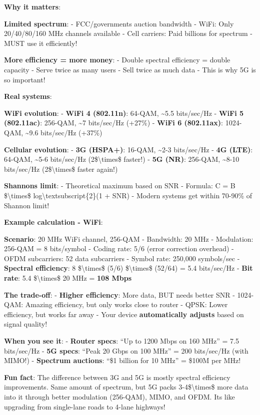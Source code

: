 \textbf{Why it matters}:

\textbf{Limited spectrum}: - FCC/governments auction bandwidth - WiFi:
Only 20/40/80/160 MHz channels available - Cell carriers: Paid billions
for spectrum - MUST use it efficiently!

\textbf{More efficiency = more money}: - Double spectral efficiency =
double capacity - Serve twice as many users - Sell twice as much data -
This is why 5G is so important!

\textbf{Real systems}:

\textbf{WiFi evolution}: - \textbf{WiFi 4 (802.11n)}: 64-QAM,
\textasciitilde5.5 bits/sec/Hz - \textbf{WiFi 5 (802.11ac)}: 256-QAM,
\textasciitilde7 bits/sec/Hz (+27\%) - \textbf{WiFi 6 (802.11ax)}:
1024-QAM, \textasciitilde9.6 bits/sec/Hz (+37\%)

\textbf{Cellular evolution}: - \textbf{3G (HSPA+)}: 16-QAM,
\textasciitilde2-3 bits/sec/Hz - \textbf{4G (LTE)}: 64-QAM,
\textasciitilde5-6 bits/sec/Hz (2\$\textbackslash times\$ faster!) -
\textbf{5G (NR)}: 256-QAM, \textasciitilde8-10 bits/sec/Hz
(2\$\textbackslash times\$ faster again!)

\textbf{Shannon\textquotesingle s limit}: - Theoretical maximum based on
SNR - Formula: C = B \$\textbackslash times\$
log\textbackslash textsubscript\{2\}(1 + SNR) - Modern systems get
within 70-90\% of Shannon limit!

\textbf{Example calculation - WiFi}:

\textbf{Scenario}: 20 MHz WiFi channel, 256-QAM - Bandwidth: 20 MHz -
Modulation: 256-QAM = 8 bits/symbol - Coding rate: 5/6 (error correction
overhead) - OFDM subcarriers: 52 data subcarriers - Symbol rate: 250,000
symbols/sec - \textbf{Spectral efficiency}: 8 \$\textbackslash times\$
(5/6) \$\textbackslash times\$ (52/64) = 5.4 bits/sec/Hz - \textbf{Bit
rate}: 5.4 \$\textbackslash times\$ 20 MHz = \textbf{108 Mbps}

\textbf{The trade-off}: - \textbf{Higher efficiency}: More data, BUT
needs better SNR - 1024-QAM: Amazing efficiency, but only works close to
router - QPSK: Lower efficiency, but works far away - Your device
\textbf{automatically adjusts} based on signal quality!

\textbf{When you see it}: - \textbf{Router specs}: ``Up to 1200 Mbps on
160 MHz'' = 7.5 bits/sec/Hz - \textbf{5G specs}: ``Peak 20 Gbps on 100
MHz'' = 200 bits/sec/Hz (with MIMO!) - \textbf{Spectrum auctions}: ``\$1
billion for 10 MHz'' = \$100M per MHz!

\textbf{Fun fact}: The difference between 3G and 5G is mostly spectral
efficiency improvements. Same amount of spectrum, but 5G packs
3-4\$\textbackslash times\$ more data into it through better modulation
(256-QAM), MIMO, and OFDM. It\textquotesingle s like upgrading from
single-lane roads to 4-lane highways!


